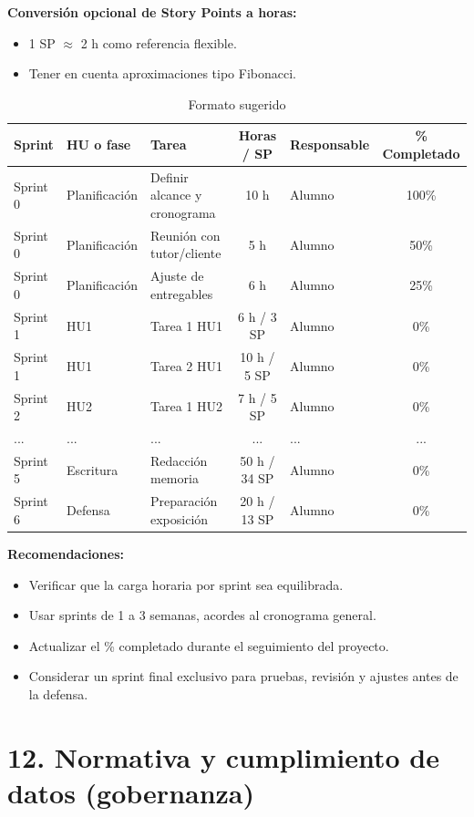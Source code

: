 \documentclass[
11pt, %
]{ProyectoVpC}
\begin{document}
\textbf{Conversión opcional de Story Points a horas:}
\begin{itemize}
  \item 1 SP \(\approx\) 2 h como referencia flexible.
  \item Tener en cuenta aproximaciones tipo Fibonacci.
\end{itemize}

\begin{table}[htpb]
\centering
\caption{Formato sugerido}
\begin{tabularx}{\linewidth}{@{}|l|l|X|c|l|c|@{}}
\hline
\rowcolor[HTML]{C0C0C0}
Sprint & HU o fase & Tarea & Horas / SP & Responsable & \% Completado \\ \hline
Sprint 0 & Planificación & Definir alcance y cronograma & 10 h & Alumno & 100\% \\ \hline
Sprint 0 & Planificación & Reunión con tutor/cliente & 5 h & Alumno & 50\% \\ \hline
Sprint 0 & Planificación & Ajuste de entregables & 6 h & Alumno & 25\% \\ \hline
Sprint 1 & HU1 & Tarea 1 HU1 & 6 h / 3 SP & Alumno & 0\% \\ \hline
Sprint 1 & HU1 & Tarea 2 HU1 & 10 h / 5 SP & Alumno & 0\% \\ \hline
Sprint 2 & HU2 & Tarea 1 HU2 & 7 h / 5 SP & Alumno & 0\% \\ \hline
... & ... & ... & ... & ... & ... \\ \hline
Sprint 5 & Escritura & Redacción memoria & 50 h / 34 SP & Alumno & 0\% \\ \hline
Sprint 6 & Defensa & Preparación exposición & 20 h / 13 SP & Alumno & 0\% \\ \hline
\end{tabularx}
\end{table}

\textbf{Recomendaciones:}
\begin{itemize}
  \item Verificar que la carga horaria por sprint sea equilibrada.
  \item Usar sprints de 1 a 3 semanas, acordes al cronograma general.
  \item Actualizar el \% completado durante el seguimiento del proyecto.
  \item Considerar un sprint final exclusivo para pruebas, revisión y ajustes antes de la defensa.
\end{itemize}


\section{12. Normativa y cumplimiento de datos (gobernanza)}
\end{document}
